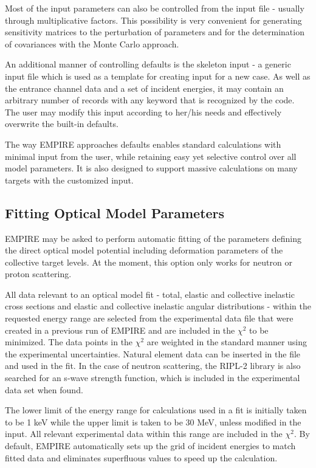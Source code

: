 Most of the input parameters can also be controlled from the input
file - usually
through multiplicative factors. This possibility is very convenient for
generating sensitivity matrices to the perturbation of parameters and
for the determination of covariances with the Monte Carlo approach.

An additional manner of controlling defaults is the skeleton input - a generic
input file which is used as a template for creating input for a new case.
As well as the entrance channel data  and a set of incident
energies, it may contain an arbitrary number of records
with any keyword that is recognized by the code.
The user may modify this input according to her/his needs and
effectively overwrite the built-in defaults.

The way EMPIRE approaches defaults enables standard calculations with
minimal input from the user,
while retaining easy yet selective control over all model
parameters. It is also designed to support massive calculations on many
targets with the customized input.

\subsection{Fitting Optical Model Parameters}

EMPIRE may be asked to perform automatic fitting of the parameters defining the
direct optical model potential including deformation parameters of the
collective target levels. At the moment, this option only
works for neutron or proton scattering.

All data relevant to an optical model fit - total, elastic and collective
inelastic cross sections and elastic and collective inelastic angular
distributions - within the requested energy range are selected from
the experimental data file that were created in a previous run of EMPIRE and
are included in the $\chi^{2}$ to be minimized.
The data points in the $\chi^{2}$
are weighted in the standard manner using the experimental uncertainties.
Natural element data can be inserted in the file and used in the fit. In the
case of neutron scattering, the RIPL-2 library is also searched for an
s-wave strength function, which is included in the experimental data set
when found.

The lower limit of the energy range for calculations used in a fit is
initially taken to be 1 keV while the upper limit is taken to be 30 MeV,
unless modified in the input. All relevant experimental data within this
range are included in the $\chi^{2}$. By default, EMPIRE automatically sets
up the grid of incident energies to match fitted data and eliminates
superfluous values to speed up the calculation.

